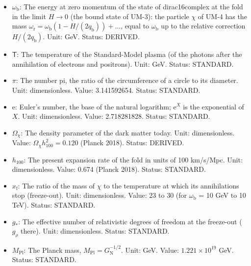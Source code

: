 \documentclass[
  10pt,
]{article}
\begin{document}
\begin{itemize}
  the fold that are in thermal equilibrium. Unit: dimensionless. Value:
  8 (four particles and four antiparticles). Status: DERIVED.
\item
  \(\omega_{\mathrm{b}}\): The energy at zero momentum of the state of
  dirac16complex at the fold in the limit \(H \to 0\) (the bound state
  of UM-3): the particle \(\chi\) of UM-4 has the mass
  \(\omega_{\mathrm{r}} = \omega_{\mathrm{b}}(1 - H/(2q_{\mathrm{b}})) + \dots\),
  equal to \(\omega_{\mathrm{b}}\) up to the relative correction
  \(H/(2q_{\mathrm{b}})\). Unit: GeV. Status: DERIVED.
\item
  \(\mathsf{T}\): The temperature of the Standard-Model plasma (of the
  photons after the annihilation of electrons and positrons). Unit: GeV.
  Status: STANDARD.
\item
  \(\pi\): The number pi, the ratio of the circumference of a circle to
  its diameter. Unit: dimensionless. Value: 3.141592654. Status:
  STANDARD.
\item
  \(\mathrm{e}\): Euler's number, the base of the natural logarithm;
  \(\mathrm{e}^{X}\) is the exponential of \(X\). Unit: dimensionless.
  Value: 2.718281828. Status: STANDARD.
\item
  \(\Omega_\chi\): The density parameter of the dark matter today. Unit:
  dimensionless. Value: \(\Omega_\chi h_{100}^2 = 0.120\) (Planck 2018).
  Status: DERIVED.
\item
  \(h_{100}\): The present expansion rate of the fold in units of 100
  km/s/Mpc. Unit: dimensionless. Value: 0.674 (Planck 2018). Status:
  STANDARD.
\item
  \(x_{\mathrm{f}}\): The ratio of the mass of \(\chi\) to the
  temperature at which its annihilations stop (freeze-out). Unit:
  dimensionless. Value: 23 to 30 (for \(\omega_{\mathrm{b}}\) = 10 GeV
  to 10 TeV). Status: STANDARD.
\item
  \(g_*\): The effective number of relativistic degrees of freedom at
  the freeze-out (\(g_\rho\) there). Unit: dimensionless. Status:
  STANDARD.
\item
  \(M_{\mathrm{Pl}}\): The Planck mass,
  \(M_{\mathrm{Pl}} = G_{\mathrm{N}}^{-1/2}\). Unit: GeV. Value:
  \(1.221\times10^{19}\) GeV. Status: STANDARD.
\end{itemize}
\end{document}

